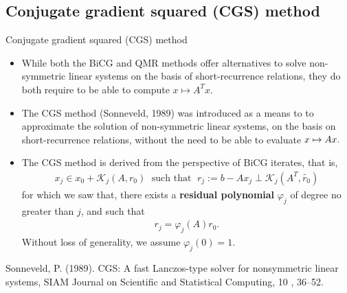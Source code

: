 \documentclass[t,usepdftitle=false]{beamer}
\begin{document}
\subsection{Conjugate gradient squared (CGS) method} 
\begin{frame}{Conjugate gradient squared (CGS) method}
\begin{itemize}
\item While both the BiCG and QMR methods offer alternatives to solve non-symmetric linear systems on the basis of short-recurrence relations, they do both require to be able to compute $x\mapsto A^Tx$.
\item[] The CGS method (Sonneveld, 1989) was introduced as a means to to approximate the solution of non-symmetric linear systems, on the basis on short-recurrence relations, without the need to be able to evaluate $x\mapsto Ax.\hspace{-1cm}$
\item The CGS method is derived from the perspective of BiCG iterates, that is,
\begin{align*}
x_j\in x_0+\mathcal{K}_j(A,r_0)
\;\text{ such that }\;
r_j:=b-Ax_j\perp\mathcal{K}_j(A^T,\tilde{r_0})
\end{align*}
for which we saw that, there exists a \textbf{residual polynomial} $\varphi_j$ of degree no greater than $j$, and such that
\begin{align*}
r_j=\varphi_j(A)r_0.
\end{align*}
Without loss of generality, we assume $\varphi_j(0)=1$.
\end{itemize}\smallskip
\tiny{Sonneveld, P. (1989). CGS: A fast Lanczos-type solver for nonsymmetric linear systems, SIAM Journal on
Scientific and Statistical Computing, 10 , 36–52.}
\end{frame}
\end{document}
